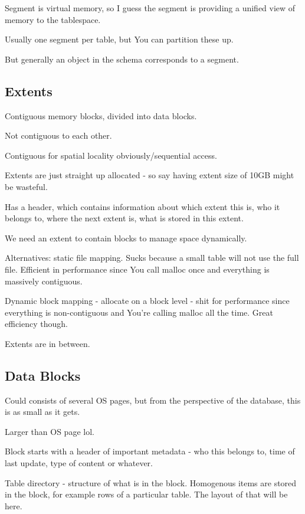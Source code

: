 \documentclass{article}
\begin{document}
			Segment is virtual memory, so I guess the segment is providing a unified view of memory to the tablespace.
			
			Usually one segment per table, but You can partition these up.
			
			But generally an object in the schema corresponds to a segment.
			
		\subsection{Extents}
		
			Contiguous memory blocks, divided into data blocks.
			
			Not contiguous to each other.
			
			Contiguous for spatial locality obviously/sequential access.
			
			Extents are just straight up allocated - so say having extent size of 10GB might be wasteful.
			
			Has a header, which contains information about which extent this is, who it belongs to, where the next extent is, what is stored in this extent.
			
			We need an extent to contain blocks to manage space dynamically.
			
			Alternatives: static file mapping. Sucks because a small table will not use the full file. Efficient in performance since You call malloc once and everything is massively contiguous.
			
			Dynamic block mapping - allocate on a block level - shit for performance since everything is non-contiguous and You're calling malloc all the time. Great efficiency though.
			
			Extents are in between.
			
		\subsection{Data Blocks}
		
			Could consists of several OS pages, but from the perspective of the database, this is as small as it gets.
			
			Larger than OS page lol.
			
			Block starts with a header of important metadata - who this belongs to, time of last update, type of content or whatever.
			
			Table directory - structure of what is in the block. Homogenous items are stored in the block, for example rows of a particular table. The layout of that will be here.
			
\end{document}
